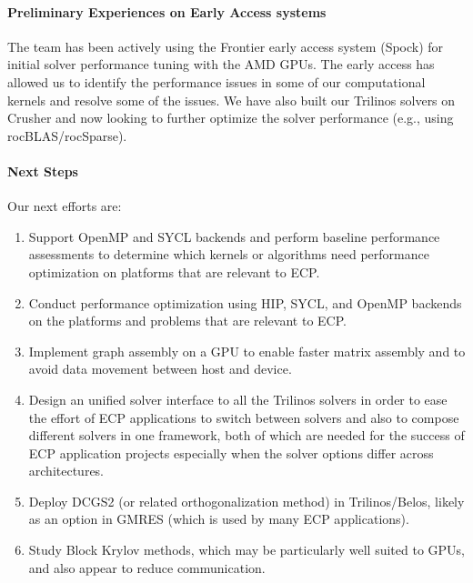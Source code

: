 \paragraph{Preliminary Experiences on Early Access systems}

The team has been actively using the Frontier early access system (Spock) for initial solver performance tuning with the AMD GPUs.
The early access has allowed us to identify the performance issues in some of our computational kernels
and resolve some of the issues.
We have also built our Trilinos solvers on Crusher and now looking to
further optimize the solver performance (e.g., using rocBLAS/rocSparse).


\paragraph{Next Steps}
Our next efforts are:
\begin{enumerate}
\item Support OpenMP and SYCL backends and
      perform baseline performance assessments to determine which kernels or algorithms need performance optimization
      on platforms that are relevant to ECP.
\item Conduct performance optimization using HIP, SYCL, and OpenMP backends on the platforms and problems
      that are relevant to ECP.
\item Implement graph assembly on a GPU to enable faster matrix assembly and to avoid data movement between host and device.
\item Design an unified solver interface to all the Trilinos solvers in order to ease the effort of ECP applications
      to switch between solvers and also to compose different solvers in one framework, both of which are needed for the success of ECP application projects especially when the solver options differ across architectures.
\item Deploy DCGS2 (or related orthogonalization method) in Trilinos/Belos, likely as an option in GMRES (which is used by many ECP applications).
\item Study Block Krylov methods, which may be particularly well suited to GPUs, and also appear to reduce communication.
\end{enumerate}

